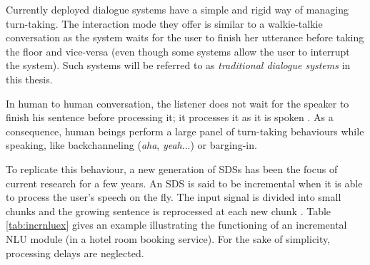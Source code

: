 		Currently deployed dialogue systems have a simple and rigid way of managing turn-taking. The interaction mode they offer is similar to a walkie-talkie conversation as the system waits for the user to finish her utterance before taking the floor and vice-versa (even though some systems allow the user to interrupt the system). Such systems will be referred to as \textit{traditional dialogue systems} in this thesis.

		In human to human conversation, the listener does not wait for the speaker to finish his sentence before processing it; it processes it as it is spoken \cite{Tanenhaus1995}. As a consequence, human beings perform a large panel of turn-taking behaviours while speaking, like backchanneling (\textit{aha}, \textit{yeah}...) or barging-in.
	
		To replicate this behaviour, a new generation of SDSs has been the focus of current research for a few years. An SDS is said to be incremental when it is able to process the user's speech on the fly. The input signal is divided into small chunks and the growing sentence is reprocessed at each new chunk \cite{Schlangen2011}. Table \ref{tab:incrnluex} gives an example illustrating the functioning of an incremental NLU module (in a hotel room booking service). For the sake of simplicity, processing delays are neglected.
	
